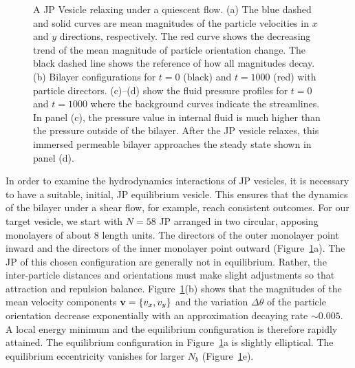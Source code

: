 \documentclass[lineno]{jfm}
\begin{document}
\begin{figure}
\caption{\label{figure2} A JP Vesicle relaxing under a quiescent flow.
  (a) The blue dashed and solid curves are mean magnitudes of the
  particle velocities in $x$ and $y$ directions, respectively. The red
  curve shows the decreasing trend of the mean magnitude of particle
  orientation change. The black dashed line shows the reference of how
  all magnitudes decay. (b) Bilayer configurations for $t=0$ (black) and
  $t=1000$ (red) with particle directors. (c)--(d) show the fluid
  pressure profiles for $t=0$ and $t=1000$ where the background curves
  indicate the streamlines. In panel (c), the pressure value in internal
  fluid is much higher than the pressure outside of the bilayer. After
  the JP vesicle relaxes, this immersed permeable bilayer approaches the
  steady state shown in panel (d).}
\end{figure}

In order to examine the hydrodynamics interactions of JP vesicles, it is
necessary to have a suitable, initial, JP equilibrium vesicle. This
ensures that the dynamics of the bilayer under a shear flow, for
example, reach consistent outcomes. For our target vesicle, we start
with $N=58$ JP arranged in two circular, apposing monolayers of about
$8$ length units. The directors of the outer monolayer point inward and
the directors of the inner monolayer point outward
(Figure~\ref{figure2}a).  The JP of this chosen configuration are
generally not in equilibrium.  Rather, the inter-particle distances and
orientations must make slight adjustments so that attraction and
repulsion balance.  Figure~\ref{figure2}(b) shows that the magnitudes of
the mean velocity components ${\bf v}=\{v_x,v_y\}$ and the variation
$\Delta \theta$ of the particle orientation decrease exponentially with
an approximation decaying rate $\sim0.005$. A local energy minimum and
the equilibrium configuration is therefore rapidly attained. The
equilibrium configuration in Figure~\ref{figure2}a is slightly
elliptical. The equilibrium eccentricity vanishes for larger $N_b$
(Figure~\ref{figure2}e).
\end{document}
